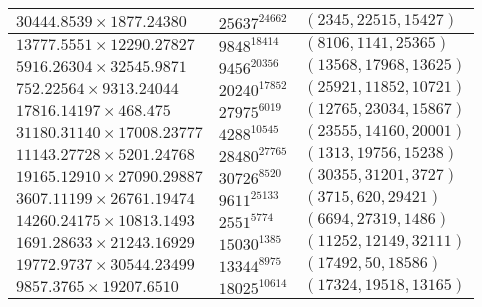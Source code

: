 \begin{longtable}{|l|l|l|}
  $30444.8539 \times 1877.24380$ & $25637^{24662}$ & $(2345,22515,15427)$ \\ \hline
  $13777.5551 \times 12290.27827$ & $9848^{18414}$ & $(8106,1141,25365)$ \\ \hline$5916.26304 \times 32545.9871$ & $9456^{20356}$ & $(13568,17968,13625)$ \\ \hline
  $752.22564 \times 9313.24044$ & $20240^{17852}$ & $(25921,11852,10721)$ \\ \hline
  $17816.14197 \times 468.475$ & $27975^{6019}$ & $(12765,23034,15867)$ \\ \hline
  $31180.31140 \times 17008.23777$ & $4288^{10545}$ & $(23555,14160,20001)$ \\ \hline
  $11143.27728 \times 5201.24768$ & $28480^{27765}$ & $(1313,19756,15238)$ \\ \hline
  $19165.12910 \times 27090.29887$ & $30726^{8520}$ & $(30355,31201,3727)$ \\ \hline
  $3607.11199 \times 26761.19474$ & $9611^{25133}$ & $(3715,620,29421)$ \\ \hline
  $14260.24175 \times 10813.1493$ & $2551^{5774}$ & $(6694,27319,1486)$ \\ \hline
  $1691.28633 \times 21243.16929$ & $15030^{1385}$ & $(11252,12149,32111)$ \\ \hline
  $19772.9737 \times 30544.23499$ & $13344^{8975}$ & $(17492,50,18586)$ \\ \hline
  $9857.3765 \times 19207.6510$ & $18025^{10614}$ & $(17324,19518,13165)$

\end{longtable}




